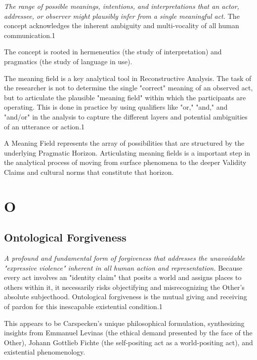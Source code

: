 \documentclass{book}
\begin{document}
\textit{The range of possible meanings, intentions, and interpretations that an actor, addressee, or observer might plausibly infer from a single meaningful act.} The concept acknowledges the inherent ambiguity and multi-vocality of all human communication.1

The concept is rooted in hermeneutics (the study of interpretation) and pragmatics (the study of language in use).

The meaning field is a key analytical tool in Reconstructive Analysis. The task of the researcher is not to determine the single "correct" meaning of an observed act, but to articulate the plausible "meaning field" within which the participants are operating. This is done in practice by using qualifiers like "or," "and," and "and/or" in the analysis to capture the different layers and potential ambiguities of an utterance or action.1

A Meaning Field represents the array of possibilities that are structured by the underlying Pragmatic Horizon. Articulating meaning fields is a important step in the analytical process of moving from surface phenomena to the deeper Validity Claims and cultural norms that constitute that horizon.

\parencite{Carspecken1995aa}




\chapter{O}

\section{Ontological Forgiveness}

\textit{A profound and fundamental form of forgiveness that addresses the unavoidable "expressive violence" inherent in all human action and representation.} Because every act involves an "identity claim" that posits a world and assigns places to others within it, it necessarily risks objectifying and misrecognizing the Other's absolute subjecthood. Ontological forgiveness is the mutual giving and receiving of pardon for this inescapable existential condition.1

This appears to be Carspecken's unique philosophical formulation, synthesizing insights from Emmanuel Levinas (the ethical demand presented by the face of the Other), Johann Gottlieb Fichte (the self-positing act as a world-positing act), and existential phenomenology.
\end{document}
